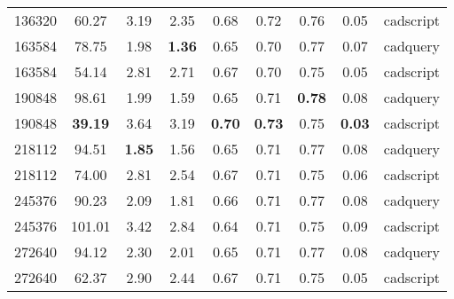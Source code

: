 \begin{table}[]
\begin{tabular}{ccccccccc}
		136320              & 60.27                 & 3.19                  & 2.35                   & 0.68                   & 0.72                   & 0.76                    & 0.05          & cadscript \\
		163584              & 78.75                 & 1.98                  & \textbf{1.36}          & 0.65                   & 0.70                   & 0.77                    & 0.07          & cadquery  \\
		163584              & 54.14                 & 2.81                  & 2.71                   & 0.67                   & 0.70                   & 0.75                    & 0.05          & cadscript \\
		190848              & 98.61                 & 1.99                  & 1.59                   & 0.65                   & 0.71                   & \textbf{0.78}           & 0.08          & cadquery  \\
		190848              & \textbf{39.19}        & 3.64                  & 3.19                   & \textbf{0.70}          & \textbf{0.73}          & 0.75                    & \textbf{0.03} & cadscript \\
		218112              & 94.51                 & \textbf{1.85}         & 1.56                   & 0.65                   & 0.71                   & 0.77                    & 0.08          & cadquery  \\
		218112              & 74.00                 & 2.81                  & 2.54                   & 0.67                   & 0.71                   & 0.75                    & 0.06          & cadscript \\
		245376              & 90.23                 & 2.09                  & 1.81                   & 0.66                   & 0.71                   & 0.77                    & 0.08          & cadquery  \\
		245376              & 101.01                & 3.42                  & 2.84                   & 0.64                   & 0.71                   & 0.75                    & 0.09          & cadscript \\
		272640              & 94.12                 & 2.30                  & 2.01                   & 0.65                   & 0.71                   & 0.77                    & 0.08          & cadquery  \\
		272640              & 62.37                 & 2.90                  & 2.44                   & 0.67                   & 0.71                   & 0.75                    & 0.05          & cadscript \\
		\hline
	\end{tabular}
\end{table}

